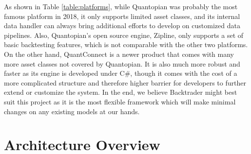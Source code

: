 \documentclass[12pt]{article}
\begin{document}
\begin{table}[H]
\caption{Platform Comparison}
\label{table:platforms}
\end{table}

As shown in Table \ref{table:platforms}, while Quantopian was probably the most famous platform in 2018, it only supports limited asset classes, and its internal data handler can always bring additional efforts to develop on customized data pipelines. Also, Quantopian's open source engine, Zipline, only supports a set of basic backtesting features, which is not comparable with the other two platforms. On the other hand, QuantConnect is a newer product that comes with many more asset classes not covered by Quantopian. It is also much more robust and faster as its engine is developed under C\#, though it comes with the cost of a more complicated structure and therefore higher barrier for developers to further extend or customize the system. In the end, we believe Backtrader might best suit this project as it is the most flexible framework which will make minimal changes on any existing models at our hands.

\section{Architecture Overview}
\end{document}
